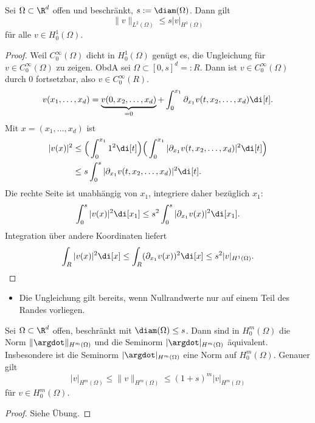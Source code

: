 \begin{st} \label{3.12}
	Sei $\Omega \subset \R^d$ offen und beschränkt, $s := \diam(\Omega)$.
	Dann gilt
	\[
		\|v\|_{L^2(\Omega)} \le s |v|_{H^1(\Omega)}
	\]
	für alle $v \in H_0^1(\Omega)$.
	\begin{proof}
		Weil $C_0^\infty(\Omega)$ dicht in $H_0^1(\Omega)$ genügt es, die Ungleichung für $v \in C_0^\infty(\Omega)$ zu zeigen.
		ObdA sei $\Omega \subset [0,s]^d =: R$.
		Dann ist $v \in C_0^\infty(\Omega)$ durch $0$ fortsetzbar, also $v \in C_0^\infty(R)$.
		\[
			v(x_1, \dotsc, x_d) = \underbrace{v(0, x_2, \dotsc, x_d)}_{=0} +  \int_0^{x_1} \partial_{x_1} v(t, x_2, \dotsc, x_d) \di[t].
		\]
		Mit $x = (x_1, \dotsc, x_d)$ ist
		\begin{align*}
			|v(x)|^2
			&\le \Big(\int_0^{x_1} 1^2 \di[t] \Big) \Big( \int_0^{x_1} |\partial_{x_1} v(t,x_2,\dotsc, x_d)|^2 \di[t] \Big) \\
			&\le s \int_0^s |\partial_{x_1} v(t, x_2, \dotsc, x_d)|^2 \di[t].
		\end{align*}
		Die rechte Seite ist unabhängig von $x_1$, integriere daher bezüglich $x_1$:
		\[
			\int_0^s |v(x)|^2 \di[x_1]
			\le s^2 \int_0^s |\partial_{x_1} v(x)|^2 \di[x_1].
		\]
		Integration über andere Koordinaten liefert
		\[
			\int_R |v(x)|^2 \di[x]
			\le \int_R (\partial_{x_1} v(x))^2 \di[x]
			\le s^2 |v|_{H^1(\Omega)}.
		\]
	\end{proof}
	\begin{note}
		\begin{itemize}
			\item
				Die Ungleichung gilt bereits, wenn Nullrandwerte nur auf einem Teil des Randes vorliegen.
		\end{itemize}
	\end{note}
\end{st}

\begin{st} \label{3.13}
	Sei $\Omega \subset \R^d$ offen, beschränkt mit $\diam(\Omega) \le s$.
	Dann sind in $H_0^m(\Omega)$ die Norm $\|\argdot\|_{H^m(\Omega)}$ und die Seminorm $|\argdot|_{H^m(\Omega)}$ äquivalent.
	Insbesondere ist die Seminorm $|\argdot|_{H^m(\Omega)}$ eine Norm auf $H_0^m(\Omega)$.
	Genauer gilt
	\[
		|v|_{H^m(\Omega)}
		\le \|v\|_{H^m(\Omega)}
		\le (1 + s)^m |v|_{H^m(\Omega)}
	\]
	für $v \in H_0^m(\Omega)$.
	\begin{proof}
		Siehe Übung.
	\end{proof}
\end{st}


